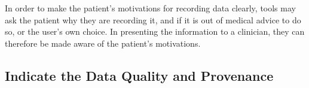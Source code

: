 \documentclass{sigchi}
\begin{document}
In order to make the patient's motivations for recording data clearly, tools may ask the patient why they are recording it, and if it is out of medical advice to do so, or the user's own choice. In presenting the information to a clinician, they can therefore be made aware of the patient's motivations.




\subsection{Indicate the Data Quality and Provenance}



\end{document}
